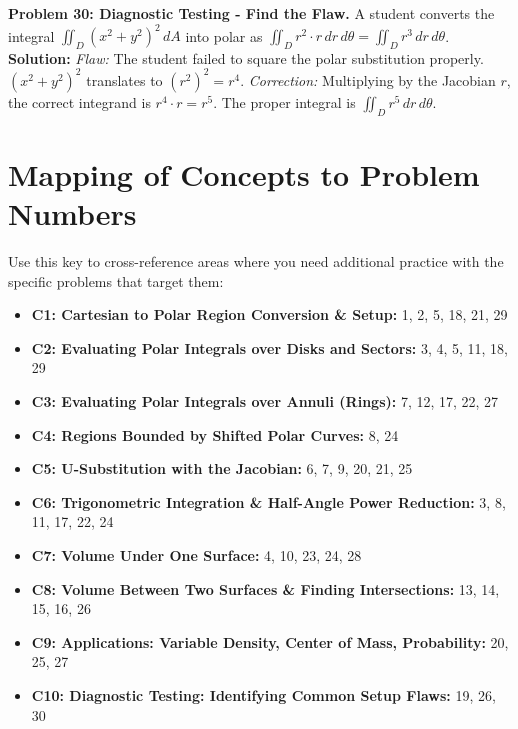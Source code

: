 \documentclass[11pt]{article}
\begin{document}
\vspace{0.5cm}
\textbf{Problem 30: Diagnostic Testing - Find the Flaw.} A student converts the integral $\iint_D (x^2+y^2)^2 \, dA$ into polar as $\iint_D r^2 \cdot r \, dr \, d\theta = \iint_D r^3 \, dr \, d\theta$.
\\
\textbf{Solution:}
\textit{Flaw:} The student failed to square the polar substitution properly. $(x^2+y^2)^2$ translates to $(r^2)^2 = r^4$. 
\textit{Correction:} Multiplying by the Jacobian $r$, the correct integrand is $r^4 \cdot r = r^5$. The proper integral is $\iint_D r^5 \, dr \, d\theta$.

\newpage
\section*{Mapping of Concepts to Problem Numbers}
Use this key to cross-reference areas where you need additional practice with the specific problems that target them:

\begin{itemize}
    \item \textbf{C1: Cartesian to Polar Region Conversion \& Setup:} 1, 2, 5, 18, 21, 29
    \item \textbf{C2: Evaluating Polar Integrals over Disks and Sectors:} 3, 4, 5, 11, 18, 29
    \item \textbf{C3: Evaluating Polar Integrals over Annuli (Rings):} 7, 12, 17, 22, 27
    \item \textbf{C4: Regions Bounded by Shifted Polar Curves:} 8, 24
    \item \textbf{C5: U-Substitution with the Jacobian:} 6, 7, 9, 20, 21, 25
    \item \textbf{C6: Trigonometric Integration \& Half-Angle Power Reduction:} 3, 8, 11, 17, 22, 24
    \item \textbf{C7: Volume Under One Surface:} 4, 10, 23, 24, 28
    \item \textbf{C8: Volume Between Two Surfaces \& Finding Intersections:} 13, 14, 15, 16, 26
    \item \textbf{C9: Applications: Variable Density, Center of Mass, Probability:} 20, 25, 27
    \item \textbf{C10: Diagnostic Testing: Identifying Common Setup Flaws:} 19, 26, 30
\end{itemize}
\end{document}
